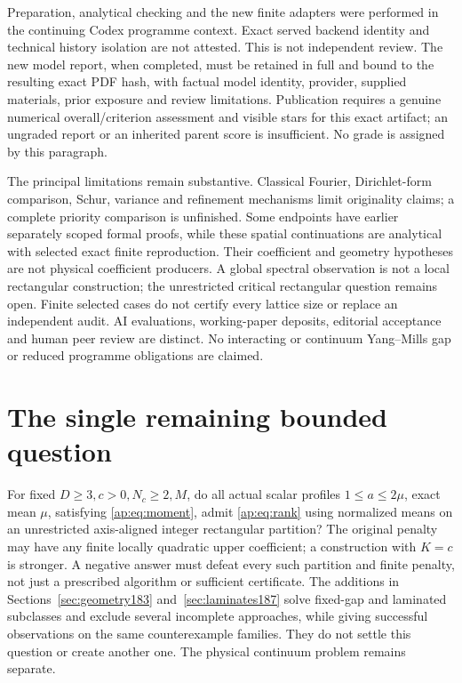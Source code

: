 \documentclass[11pt]{article}
\begin{document}
Preparation, analytical checking and the new finite adapters were performed
in the continuing Codex programme context. Exact served backend identity
and technical history isolation are not attested. This is not independent
review. The new model report, when completed, must be retained in full and
bound to the resulting exact PDF hash, with factual model identity,
provider, supplied materials, prior exposure and review limitations.
Publication requires a genuine numerical overall/criterion assessment and
visible stars for this exact artifact; an ungraded report or an inherited
parent score is insufficient. No grade is assigned by this paragraph.

The principal limitations remain substantive. Classical Fourier,
Dirichlet-form comparison, Schur, variance and refinement mechanisms limit
originality claims; a complete priority comparison is unfinished. Some
endpoints have earlier separately scoped formal proofs, while these spatial
continuations are analytical with selected exact finite reproduction.
Their coefficient and geometry hypotheses are not physical coefficient
producers. A global spectral observation is not a local rectangular
construction; the unrestricted critical rectangular question remains open.
Finite selected cases do not certify every lattice size or replace an
independent audit. AI evaluations, working-paper deposits, editorial
acceptance and human peer review are distinct. No interacting or continuum
Yang--Mills gap or reduced programme obligations are claimed.
\section{The single remaining bounded question}
For fixed $D\geq3,c>0,N_c\geq2,M$, do all actual scalar profiles
$1\leq a\leq2\mu$, exact mean $\mu$, satisfying \eqref{ap:eq:moment}, admit
\eqref{ap:eq:rank} using normalized means on an unrestricted axis-aligned
integer rectangular partition? The original penalty may have any finite
locally quadratic upper coefficient; a construction with $K=c$ is stronger.
A negative answer must defeat every such partition and finite penalty,
not just a prescribed algorithm or sufficient certificate. The additions
in Sections~\ref{sec:geometry183} and~\ref{sec:laminates187} solve fixed-gap and laminated subclasses and exclude
several incomplete approaches, while giving successful observations on
the same counterexample families. They do not settle this question or
create another one. The physical continuum problem remains separate.
\end{document}
